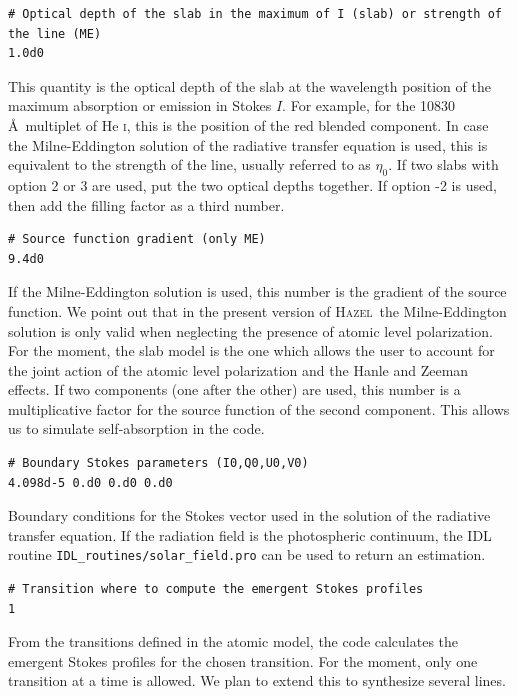 \documentclass[12pt]{article}
\def\H{\textsc{Hazel}}
\begin{document}
\begin{small}
\begin{verbatim}
# Optical depth of the slab in the maximum of I (slab) or strength of the line (ME)
1.0d0
\end{verbatim}
\end{small}
This quantity is the optical depth of the slab at the wavelength position of the maximum absorption
or emission in Stokes $I$. For example, for the 10830 \AA\ multiplet of He \textsc{i}, this is the 
position of the red blended component. In case the Milne-Eddington solution of the radiative transfer
equation is used, this is equivalent to the strength of the line, usually referred to
as $\eta_0$. If two slabs with option 2 or 3 are used, put the two optical depths together. If option -2 is
used, then add the filling factor as a third number.

\begin{verbatim}
# Source function gradient (only ME)
9.4d0
\end{verbatim}
If the Milne-Eddington solution is used, this number is the gradient of the source function. We
point out that in the present version of \H\ the Milne-Eddington solution is only valid when
neglecting the presence of atomic level polarization. For the moment, the slab model is the one
which allows the user to account for the joint action of the atomic level polarization and the
Hanle and Zeeman effects. If two components (one after the other) are used, this number is a
multiplicative factor for the source function of the second component. This allows us to 
simulate self-absorption in the code.

\begin{verbatim}
# Boundary Stokes parameters (I0,Q0,U0,V0)
4.098d-5 0.d0 0.d0 0.d0
\end{verbatim}
Boundary conditions for the Stokes vector used in the solution of the radiative transfer equation.
If the radiation field is the photospheric continuum, the IDL routine \texttt{IDL\_routines/solar\_field.pro}
can be used to return an estimation.

\begin{verbatim}
# Transition where to compute the emergent Stokes profiles
1
\end{verbatim}
From the transitions defined in the atomic model, the code calculates the emergent Stokes profiles
for the chosen transition. For the moment, only one transition at a time is allowed. We plan to
extend this to synthesize several lines.
\end{document}
